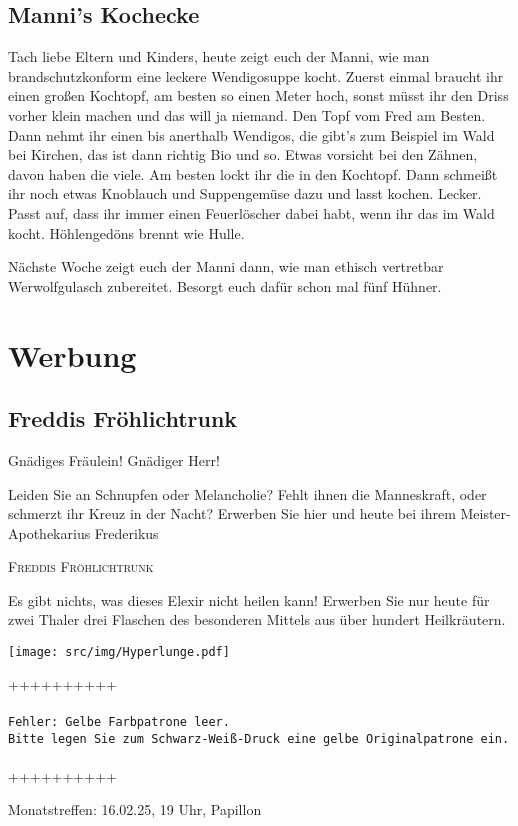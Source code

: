 \documentclass[final]{multiversum}
\begin{document}
\subsection{Manni's Kochecke}
Tach liebe Eltern und Kinders, heute zeigt euch der Manni, wie man
brandschutzkonform eine leckere Wendigosuppe kocht. Zuerst einmal braucht ihr
einen großen Kochtopf, am besten so einen Meter hoch, sonst müsst ihr den Driss
vorher klein machen und das will ja niemand. Den Topf vom Fred am Besten. 
Dann nehmt ihr einen bis anerthalb Wendigos, die gibt's zum Beispiel im Wald bei Kirchen, 
das ist dann richtig Bio und so. Etwas vorsicht bei den Zähnen, davon haben die viele. 
Am besten lockt ihr die in den Kochtopf. Dann schmeißt ihr noch etwas Knoblauch und Suppengemüse
dazu und lasst kochen. Lecker. Passt auf, dass ihr immer einen Feuerlöscher
dabei habt, wenn ihr das im Wald kocht. Höhlengedöns brennt wie Hulle.

Nächste Woche zeigt euch der Manni dann, wie man ethisch vertretbar
Werwolfgulasch zubereitet. Besorgt euch dafür schon mal fünf Hühner.


\section{Werbung}
\subsection{Freddis Fröhlichtrunk}
Gnädiges Fräulein! Gnädiger Herr!  

Leiden Sie an Schnupfen oder Melancholie? Fehlt ihnen die Manneskraft, oder schmerzt ihr Kreuz in der Nacht? Erwerben Sie hier und heute bei ihrem Meister-Apothekarius Frederikus

\begin{center}\textsc{Freddis Fröhlichtrunk}\end{center}

Es gibt nichts, was dieses Elexir nicht heilen kann! Erwerben Sie nur heute für zwei Thaler drei Flaschen des besonderen Mittels aus über hundert Heilkräutern. 

\texttt{[image: src/img/Hyperlunge.pdf]}

\vspace{2cm}
\noindent ++++++++++\\
\\
\texttt{Fehler: Gelbe Farbpatrone leer.} \\
{\color{gray}
\texttt{Bitte legen Sie zum Schwarz-Weiß-Druck eine gelbe Originalpatrone ein.}\\
\\
++++++++++}
\vfill

\begin{termine}
\item Monatstreffen: 16.02.25, 19 Uhr, Papillon
\end{termine}
\impressum
\end{document}
